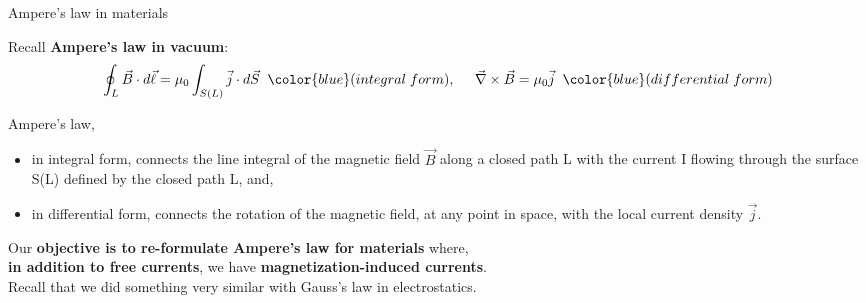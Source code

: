\begin{frame}{Ampere's law in materials}

Recall {\bf Ampere's law in vacuum}:
\begin{equation*}
  \oint_{L} \vec{B} \cdot d\vec{\ell} = \mu_0 \int_{S(L)} \vec{j} \cdot d\vec{S} \;\;
  {\color{blue}(integral\;form)},
  \;\;\;\;\;
  \vec{\nabla} \times \vec{B} = \mu_0 \vec{j} \;\;
  {\color{blue}(differential\;form)}
\end{equation*}

Ampere's law,
\begin{itemize}
     \item in integral form, connects the line integral of the
               magnetic field $\vec{B}$ along a closed path L with the current I
               flowing through the surface S(L) defined by the closed path L, and,
     \item in differential form, connects the rotation of the magnetic field,
               at any point in space, with the local current density $\vec{j}$.\\
 \end{itemize}

\vspace{0.2cm}

Our {\bf objective is to re-formulate Ampere's law for materials} where, \\
{\bf in addition to free currents}, we have {\bf magnetization-induced currents}.\\

\vspace{0.2cm}
Recall that we did something very similar with Gauss's law in electrostatics. \\

\end{frame}


